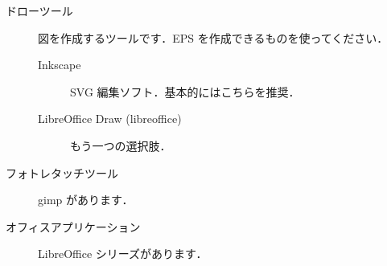 \documentclass[main]{subfiles}
\begin{document}
\begin{description}
\begin{description}
    \end{description}

    \item[ドローツール] 図を作成するツールです．EPS を作成できるものを使ってください．

    \begin{description}
       
        \item[\textrm{Inkscape}] SVG 編集ソフト．基本的にはこちらを推奨．

        \item[\textrm{LibreOffice Draw (libreoffice)}] もう一つの選択肢．
   
    \end{description}

    \item[フォトレタッチツール] gimp があります．
    
    \item[オフィスアプリケーション] LibreOffice シリーズがあります．

\end{description}
\end{document}
